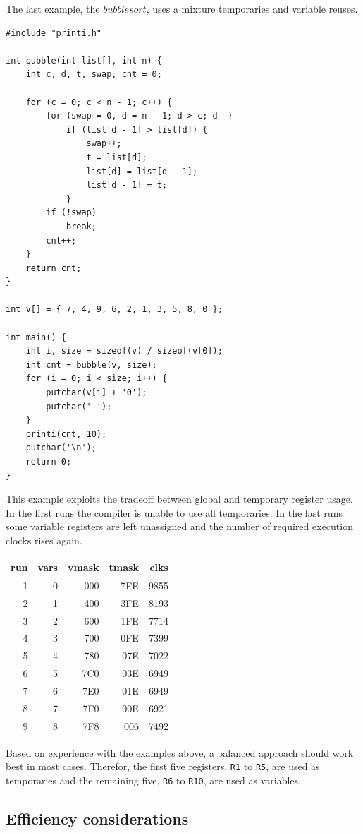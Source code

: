 \documentclass[journal]{IEEEtran}
\begin{document}
The last example, the $bubble sort$, uses a mixture temporaries and variable
reuses.
{\small
\begin{verbatim}
#include "printi.h"

int bubble(int list[], int n) {
    int c, d, t, swap, cnt = 0;

    for (c = 0; c < n - 1; c++) {
        for (swap = 0, d = n - 1; d > c; d--)
            if (list[d - 1] > list[d]) {
                swap++;
                t = list[d];
                list[d] = list[d - 1];
                list[d - 1] = t;
            }
        if (!swap)
            break;
        cnt++;
    }
    return cnt;
}

int v[] = { 7, 4, 9, 6, 2, 1, 3, 5, 8, 0 };

int main() {
    int i, size = sizeof(v) / sizeof(v[0]);
    int cnt = bubble(v, size);
    for (i = 0; i < size; i++) {
        putchar(v[i] + '0');
        putchar(' ');
    }
    printi(cnt, 10);
    putchar('\n');
    return 0;
}
\end{verbatim}
}
This example exploits the tradeoff between global and temporary register
usage.
In the first runs the compiler is unable to use all temporaries.
In the last runs some variable registers are left unassigned and the number
of required execution clocks rises again.
\begin{center}
{\small
\begin{tabular}{r|r|r|r|r}
run&vars&vmask&tmask&clks\\\hline
1&0&000&7FE&9855\\
2&1&400&3FE&8193\\
3&2&600&1FE&7714\\
4&3&700&0FE&7399\\
5&4&780&07E&7022\\
6&5&7C0&03E&6949\\
7&6&7E0&01E&6949\\
8&7&7F0&00E&6921\\
9&8&7F8&006&7492\\
\end{tabular}
}
\end{center}

Based on experience with the examples above, a balanced approach should work best
in most cases.
Therefor, the first five registers, {\tt R1} to {\tt R5}, are used as temporaries
and the remaining five, {\tt R6} to {\tt R10}, are used as variables.

\subsection{Efficiency considerations}
\end{document}
